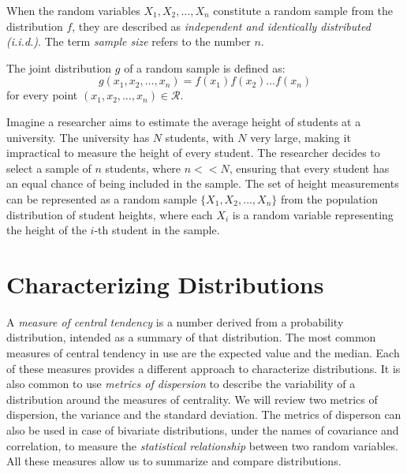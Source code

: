 When the random variables $X_1, X_2, \ldots, X_n$ constitute a random sample from the distribution $f$, they are described as \emph{independent and identically distributed (i.i.d.)}. The term \emph{sample size} refers to the number $n$.

The joint distribution $g$ of a random sample is defined as:
\[
g \left( x_1, x_2, \ldots, x_n \right) = f \left( x_1 \right) f \left( x_2 \right) \ldots f \left( x_n \right)
\]
for every point $\left( x_1, x_2, \ldots, x_n \right) \in \mathcal{R}$.

\begin{example}
Imagine a researcher aims to estimate the average height of students at a university. The university has $N$ students, with $N$ very large, making it impractical to measure the height of every student. The researcher decides to select a sample of $n$ students, where $n << N$, ensuring that every student has an equal chance of being included in the sample. The set of height measurements can be represented as a random sample $\{X_1, X_2, \ldots, X_n\}$ from the population distribution of student heights, where each $X_i$ is a random variable representing the height of the $i$-th student in the sample.
\end{example}

%
%

\section{Characterizing Distributions}
\label{sec:probability_expectation}

A \emph{measure of central tendency} is a number derived from a probability distribution, intended as a summary of that distribution. The most common measures of central tendency in use are the expected value and the median. Each of these measures provides a different approach to characterize distributions. It is also common to use \emph{metrics of dispersion} to describe the variability of a distribution around the measures of centrality. We will review two metrics of dispersion, the variance and the standard deviation. The metrics of disperson can also be used in case of bivariate distributions, under the names of covariance and correlation, to measure the \emph{statistical relationship} between two random variables. All these measures allow us to summarize and compare distributions.


